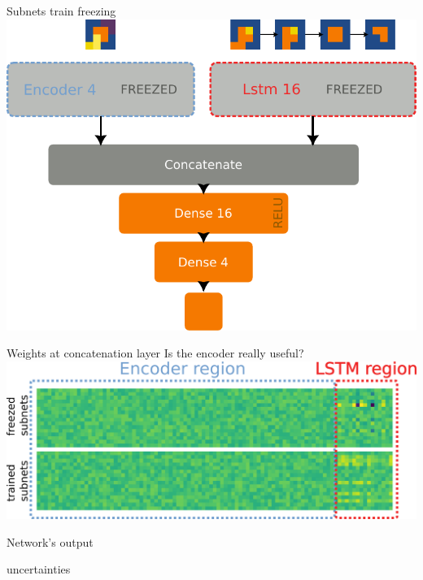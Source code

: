 \documentclass{beamer}
\begin{document}

    


\begin{frame}{Subnets train freezing}
    \includegraphics[width=.8\linewidth]{figures/freezetraining_2.pdf}
\end{frame}

\begin{frame}{Weights at concatenation layer}
    Is the encoder really useful?
    \vfill
    \includegraphics[width=\linewidth]{figures/weights_comparison.png}
\end{frame}

\begin{frame}[fragile]{Network's output}


    
\end{frame}

\begin{frame}{uncertainties}
    
\end{frame}
\end{document}
